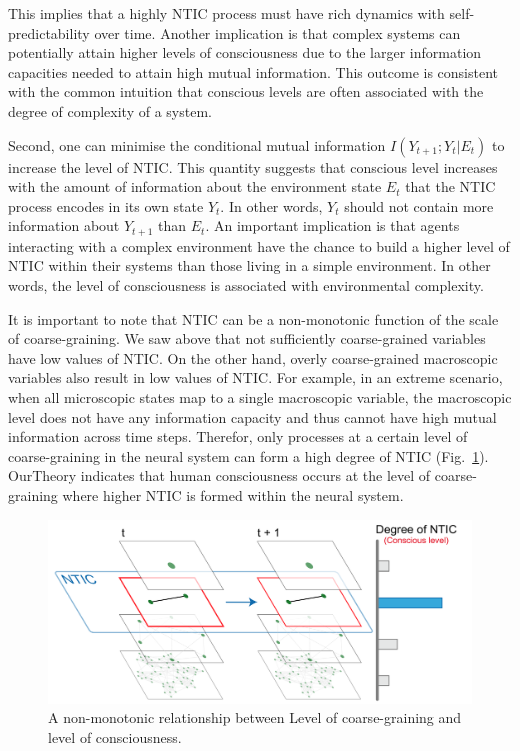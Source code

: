 \documentclass[utf8]{article}
\begin{document}
            This implies that a highly NTIC process must have rich dynamics with self-predictability over time. Another implication is that complex systems can potentially attain higher levels of consciousness due to the larger information capacities needed to attain high mutual information. This outcome is consistent with the common intuition that conscious levels are often associated with the degree of complexity of a system.
    
    	    Second, one can minimise the conditional mutual information $I(Y_{t+1};Y_{t}|E_{t})$ to increase the level of NTIC. This quantity suggests that conscious level increases with the amount of information about the environment state $E_t$ that the NTIC process encodes in its own state $Y_t$. In other words, $Y_t$ should not contain more information about $Y_{t+1}$ than $E_t$. An important implication is that agents interacting with a complex environment have the chance to build a higher level of NTIC within their systems than those living in a simple environment. In other words, the level of consciousness is associated with environmental complexity. 
    	   
    		It is important to note that NTIC can be a non-monotonic function of the scale of coarse-graining. We saw above that not sufficiently coarse-grained variables have low values of NTIC. On the other hand, overly coarse-grained macroscopic variables  also result in low values of NTIC. For example, in an extreme scenario, when all microscopic states map to a single macroscopic variable, the macroscopic level does not have any information capacity and thus cannot have high mutual information across time steps.  Therefor, only processes at a certain level of coarse-graining in the neural system can form a high degree of NTIC (Fig.~\ref{fig:LevelOfConsciousness}). \ac{OurTheory} indicates that human consciousness occurs at the level of coarse-graining where higher NTIC is formed within the neural system. 
    		
    		\begin{figure}[H]				
        		\includegraphics[width=\textwidth]{WritingMaterials/Fig_nonMono/nonMono.pdf}
        		\caption{A non-monotonic relationship between Level of coarse-graining and level of consciousness.}
        		\label{fig:LevelOfConsciousness}
    		\end{figure}
            
\end{document}
